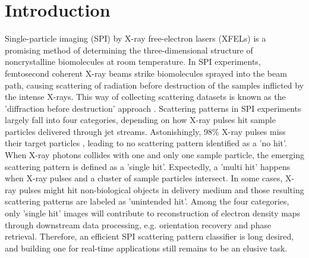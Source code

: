 \section{Introduction}


Single-particle imaging (SPI) by X-ray free-electron lasers (XFELs) is a
promising method of determining the three-dimensional structure of
noncrystalline biomolecules at room temperature.   In SPI experiments,
femtosecond coherent X-ray beams strike biomolecules sprayed into the beam path,
causing scattering of radiation before destruction of the samples inflicted by
the intense X-rays.  This way of collecting scattering datasets is known as the
'diffraction before destruction' approach
\cite{neutzePotentialBiomolecularImaging2000,
chapmanFemtosecondDiffractiveImaging2006,seibertSingleMimivirusParticles2011,
aquilaLinacCoherentLight2015,reddyCoherentSoftXray2017}.  Scattering patterns in
SPI experiments largely fall into four categories, depending on how X-ray pulses
hit sample particles delivered through jet streams.  Astonishingly, 98\% X-ray
pulses miss their target particles
\cite{shiEvaluationPerformanceClassification2019}, leading to no scattering
pattern identified as a 'no hit'.  When X-ray photons collides with one and only
one sample particle, the emerging scattering pattern is defined as a 'single
hit'. Expectedly, a 'multi hit' happens when X-ray pulses and a cluster of
sample particles intersect. In some cases, X-ray pulses might hit non-biological
objects in delivery medium and those resulting scattering patterns are labeled
as 'unintended hit'.  Among the four categories, only 'single hit' images will
contribute to reconstruction of electron density maps through downstream data
processing, e.g. orientation recovery and phase retrieval.  Therefore, an
efficient SPI scattering pattern classifier is long desired, and building one
for real-time applications still remains to be an elusive task.


% 

